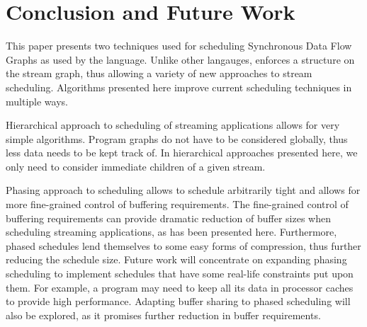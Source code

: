 \section{Conclusion and Future Work}

This paper presents two techniques used for scheduling Synchronous
Data Flow Graphs as used by the {\StreamIt} language. Unlike other
langauges, {\StreamIt} enforces a structure on the stream graph,
thus allowing a variety of new approaches to stream scheduling.
Algorithms presented here improve current scheduling techniques in
multiple ways.

Hierarchical approach to scheduling of streaming applications
allows for very simple algorithms. Program graphs do not have to
be considered globally, thus less data needs to be kept track of.
In hierarchical approaches presented here, we only need to
consider immediate children of a given stream.

Phasing approach to scheduling allows to schedule arbitrarily
tight {\feedbackloops} and allows for more fine-grained control
of buffering requirements. The fine-grained control of buffering
requirements can provide dramatic reduction of buffer sizes when
scheduling streaming applications, as has been presented here.
Furthermore, phased schedules lend themselves to some easy forms
of compression, thus further reducing the schedule size. Future
work will concentrate on expanding phasing scheduling to implement
schedules that have some real-life constraints put upon them. For
example, a program may need to keep all its data in processor
caches to provide high performance. Adapting buffer sharing to
phased scheduling will also be explored, as it promises further
reduction in buffer requirements.
